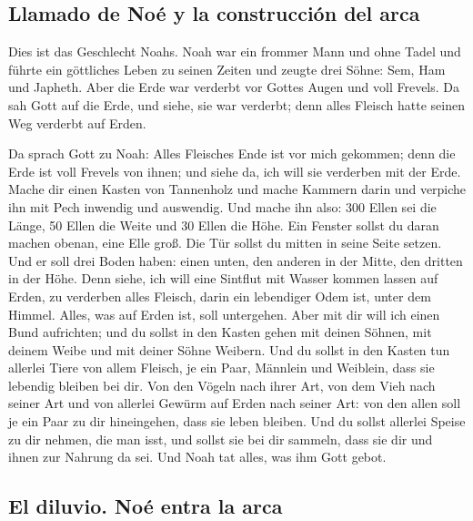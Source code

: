 \hypertarget{llamado-de-nouxe9-y-la-construcciuxf3n-del-arca}{%
\subsection{Llamado de Noé y la construcción del
arca}\label{llamado-de-nouxe9-y-la-construcciuxf3n-del-arca}}

 Dies ist das Geschlecht Noahs. Noah war ein frommer Mann
und ohne Tadel und führte ein göttliches Leben zu seinen Zeiten
 und zeugte drei Söhne: Sem, Ham und Japheth.
 Aber die Erde war verderbt vor Gottes Augen und voll
Frevels.  Da sah Gott auf die Erde, und siehe, sie war
verderbt; denn alles Fleisch hatte seinen Weg verderbt auf Erden.

 Da sprach Gott zu Noah: Alles Fleisches Ende ist vor
mich gekommen; denn die Erde ist voll Frevels von ihnen; und siehe da,
ich will sie verderben mit der Erde.  Mache dir einen
Kasten von Tannenholz und mache Kammern darin und verpiche ihn mit Pech
inwendig und auswendig.  Und mache ihn also: 300 Ellen
sei die Länge, 50 Ellen die Weite und 30 Ellen die Höhe. 
Ein Fenster sollst du daran machen obenan, eine Elle groß. Die Tür
sollst du mitten in seine Seite setzen. Und er soll drei Boden haben:
einen unten, den anderen in der Mitte, den dritten in der Höhe.
 Denn siehe, ich will eine Sintflut mit Wasser kommen
lassen auf Erden, zu verderben alles Fleisch, darin ein lebendiger Odem
ist, unter dem Himmel. Alles, was auf Erden ist, soll untergehen.
 Aber mit dir will ich einen Bund aufrichten; und du
sollst in den Kasten gehen mit deinen Söhnen, mit deinem Weibe und mit
deiner Söhne Weibern.  Und du sollst in den Kasten tun
allerlei Tiere von allem Fleisch, je ein Paar, Männlein und Weiblein,
dass sie lebendig bleiben bei dir.  Von den Vögeln nach
ihrer Art, von dem Vieh nach seiner Art und von allerlei Gewürm auf
Erden nach seiner Art: von den allen soll je ein Paar zu dir
hineingehen, dass sie leben bleiben.  Und du sollst
allerlei Speise zu dir nehmen, die man isst, und sollst sie bei dir
sammeln, dass sie dir und ihnen zur Nahrung da sei.  Und
Noah tat alles, was ihm Gott gebot.

\hypertarget{el-diluvio.-nouxe9-entra-la-arca}{%
\subsection{El diluvio. Noé entra la
arca}\label{el-diluvio.-nouxe9-entra-la-arca}}

